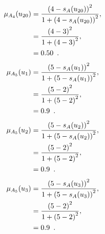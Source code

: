\documentclass[a4paper,openany]{book}
\begin{document}
				\begin{align}
					\mu_{A_4}(u_{20}) &= \frac{\left(4-s_A(u_{20})\right)^2}{1 + \left(4-s_A(u_{20})\right)^2} ,\\
					&= \frac{\left(4-3\right)^2}{1 + \left(4-3\right)^2} \notag ,\\
					&= 0.50 \enspace. \notag
				\end{align}
				\begin{align}
					\mu_{A_5}(u_1) &= \frac{\left(5-s_A(u_1)\right)^2}{1 + \left(5-s_A(u_1)\right)^2} ,\\
					&= \frac{\left(5-2\right)^2}{1 + \left(5-2\right)^2} \notag ,\\
					&= 0.9 \enspace. \notag
				\end{align}
				\begin{align}
					\mu_{A_5}(u_2) &= \frac{\left(5-s_A(u_2)\right)^2}{1 + \left(5-s_A(u_2)\right)^2} ,\\
					&= \frac{\left(5-2\right)^2}{1 + \left(5-2\right)^2} \notag ,\\
					&= 0.9 \enspace. \notag
				\end{align}
				\begin{align}
					\mu_{A_5}(u_3) &= \frac{\left(5-s_A(u_3)\right)^2}{1 + \left(5-s_A(u_3)\right)^2} ,\\
					&= \frac{\left(5-2\right)^2}{1 + \left(5-2\right)^2} \notag ,\\
					&= 0.9 \enspace. \notag
				\end{align}
\end{document}
